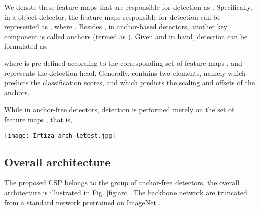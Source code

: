 \documentclass[review]{elsarticle}
\begin{document}
We denote these feature maps that are responsible for detection as . Specifically, in a object detector, the feature maps responsible for detection can be represented as , where . Besides , in anchor-based detectors, another key component is called anchors (termed as ). Given  and  in hand, detection can be formulated as:

where  is pre-defined according to the corresponding set of feature maps , and  represents the detection head. Generally,  contains two elements, namely  which predicts the classification scores, and  which predicts the scaling and offsets of the anchors.

While in anchor-free detectors, detection is performed merely on the set of feature maps , that is,


\begin{figure*}
\begin{center}
\texttt{[image: Irtiza\_arch\_letest.jpg]}
\end{center}
   \caption{Overall architecture of CSP, which mainly comprises two components, i.e. the feature extraction module and the detection head. The feature extraction module concatenates feature maps of different resolutions into a single one. The detection head merely contains a 3x3 convolutional layer, followed by three prediction layers, for the offset prediction, center location and the the corresponding scale.}
\label{fig:arc}
\end{figure*}

\subsection{Overall architecture}\label{sec:arc}
The proposed CSP belongs to the group of anchor-free detectors, the overall architecture is illustrated in Fig. \ref{fig:arc}. The backbone network are truncated from a standard network pretrained on ImageNet \cite{deng2009imagenet}.
\end{document}
